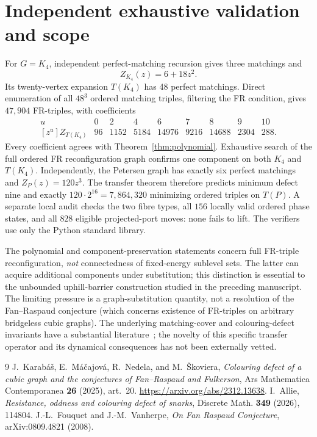 \documentclass[11pt]{article}
\newcommand{\coef}[2]{[z^{#1}]#2}
\begin{document}
\section{Independent exhaustive validation and scope}
For $G=K_4$, independent perfect-matching recursion gives three matchings and
\[
 Z_{K_4}(z)=6+18z^2.
\]
Its twenty-vertex expansion $T(K_4)$ has 48 perfect matchings. Direct enumeration of all $48^3$ ordered matching triples, filtering the FR condition, gives $47{,}904$ FR-triples, with coefficients
\[
\begin{array}{c|rrrrrrrr}
u&0&2&4&6&7&8&9&10\\\hline
\coef{u}{Z_{T(K_4)}}&96&1152&5184&14976&9216&14688&2304&288.
\end{array}
\]
Every coefficient agrees with Theorem~\ref{thm:polynomial}. Exhaustive search of the full ordered FR reconfiguration graph confirms one component on both $K_4$ and $T(K_4)$. Independently, the Petersen graph has exactly six perfect matchings and $Z_P(z)=120z^3$. The transfer theorem therefore predicts minimum defect nine and exactly $120\cdot2^{16}=7{,}864{,}320$ minimizing ordered triples on $T(P)$. A separate local audit checks the two fibre types, all $156$ locally valid ordered phase states, and all $828$ eligible projected-port moves: none fails to lift. The verifiers use only the Python standard library.

The polynomial and component-preservation statements concern full FR-triple reconfiguration, \emph{not} connectedness of fixed-energy sublevel sets. The latter can acquire additional components under substitution; this distinction is essential to the unbounded uphill-barrier construction studied in the preceding manuscript. The limiting pressure is a graph-substitution quantity, not a resolution of the Fan--Raspaud conjecture (which concerns existence of FR-triples on arbitrary bridgeless cubic graphs). The underlying matching-cover and colouring-defect invariants have a substantial literature~\cite{Karabas,Allie,Fouquet}; the novelty of this specific transfer operator and its dynamical consequences has not been externally vetted.

\begin{thebibliography}{9}\small
{} J.~Karab\'a\v{s}, E.~M\'a\v{c}ajov\'a, R.~Nedela, and M.~\v{S}koviera, \emph{Colouring defect of a cubic graph and the conjectures of Fan--Raspaud and Fulkerson}, Ars Mathematica Contemporanea \textbf{26} (2025), art.~20. \url{https://arxiv.org/abs/2312.13638}.
 I.~Allie, \emph{Resistance, oddness and colouring defect of snarks}, Discrete Math. \textbf{349} (2026), 114804.
 J.-L.~Fouquet and J.-M.~Vanherpe, \emph{On Fan Raspaud Conjecture}, arXiv:0809.4821 (2008).
\end{thebibliography}
\end{document}

